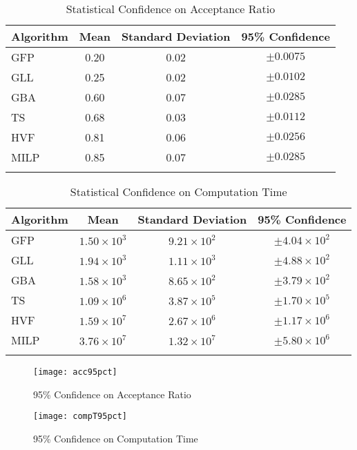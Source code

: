 \documentclass[conference]{IEEEtran}
\begin{document}
\begin{table}[t]
      \caption{Statistical Confidence on Acceptance Ratio}
      \centering
      \renewcommand{\arraystretch}{1.3}
\begin{tabular}{l c c c}\hline
 Algorithm &  Mean & Standard Deviation &  95\% Confidence\\
\hline\hline
GFP & 0.20  & 0.02 & $\pm 0.0075$ \\
GLL & 0.25 & 0.02 & $\pm 0.0102$ \\
GBA & 0.60 & 0.07 & $\pm 0.0285$ \\
TS & 0.68 & 0.03 & $\pm 0.0112$ \\
HVF & 0.81 & 0.06 & $\pm 0.0256$ \\
MILP & 0.85 & 0.07 & $\pm 0.0285$ \\
\hline
\label{Tacc95}
\end{tabular}
\end{table}    
    
    
\begin{table}[t]    
      \centering
      \renewcommand{\arraystretch}{1.3}
        \caption{\scriptsize Statistical Confidence on Computation Time}
\begin{tabular}{l c c c}\hline
 Algorithm &  Mean & Standard Deviation &  95\% Confidence\\
\hline\hline
GFP & $1.50\times 10^3$ & $9.21\times 10^2$ & $\pm 4.04\times 10^2$ \\
GLL & $1.94\times 10^3$ & $1.11\times 10^3$ & $\pm 4.88\times 10^2$ \\
GBA & $1.58\times 10^3$ & $8.65\times 10^2$ & $\pm 3.79\times 10^2$ \\
TS & $1.09\times 10^6$ & $3.87\times 10^5$ & $\pm 1.70\times 10^5$ \\
HVF & $1.59\times 10^7$ & $2.67\times 10^6$ & $\pm 1.17\times 10^6$ \\
MILP & $3.76\times 10^7$ & $1.32\times 10^7$ & $\pm 5.80\times 10^6$ \\
\hline
\label{Tacc951}
\end{tabular}
\end{table}

\begin{figure*}[t]
\setlength{\abovecaptionskip}{7pt plus 0pt minus 0pt}
\setlength{\belowcaptionskip}{7pt plus 0pt minus 0pt}

\begin{minipage}{.49\textwidth}
\resizebox{.99\textwidth}{!}
{\texttt{[image: acc95pct]}}
  \caption{95\% Confidence on Acceptance Ratio}
  \label{acc95pct}
\end{minipage}
\begin{minipage}{.49\textwidth}
\resizebox{.99\textwidth}{!}
{\texttt{[image: compT95pct]}}
  \caption{95\% Confidence on Computation Time}
  \label{compT95pct}
\end{minipage}
\end{figure*}
\end{document}
